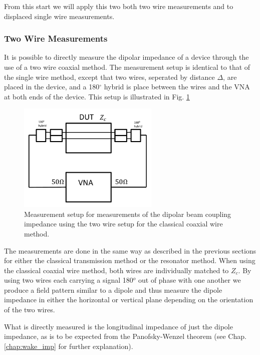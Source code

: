 \documentclass[review, number, sort&compress]{elsarticle}
\begin{document}
From this start we will apply this two both two wire measurements and to displaced single wire measurements.

\subsubsection{Two Wire Measurements}

It is possible to directly measure the dipolar impedance of a device through the use of a two wire coaxial method. The measurement setup is identical to that of the single wire method, except that two wires, seperated by distance $\Delta$, are placed in the device, and a 180$^{\circ}$ hybrid is place between the wires and the VNA at both ends of the device. This setup is illustrated in Fig. \ref{fig:two_wire_measure}

\begin{figure}
\begin{center}
\includegraphics[width=0.6\textwidth]{figures/wire_meas_two_wire.pdf}
\end{center}
\label{fig:two_wire_measure}
\caption{Measurement setup for measurements of the dipolar beam coupling impedance using the two wire setup for the classical coaxial wire method.}
\end{figure}

The measurements are done in the same way as described in the previous sections for either the classical transmission method or the resonator method. When using the classical coaxial wire method, both wires are individually matched to $Z_{c}$. By using two wires each carrying a signal 180$^{o}$ out of phase with one another we produce a field pattern similar to a dipole and thus measure the dipole impedance in either the horizontal or vertical plane depending on the orientation of the two wires. 

What is directly measured is the longitudinal impedance of just the dipole impedance, as is to be expected from the Panofsky-Wenzel theorem (see Chap. \ref{chap:wake_imp} for further explanation). 
\end{document}
